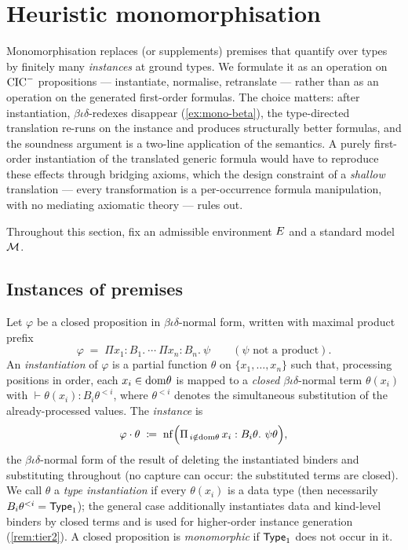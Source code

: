 \section{Heuristic monomorphisation}
\label{sec:mono}

Monomorphisation replaces (or supplements) premises that quantify
over types by finitely many \emph{instances} at ground types.  We
formulate it as an operation on $\mathrm{CIC}^{-}$ propositions --- instantiate,
normalise, retranslate --- rather than as an operation on the
generated first-order formulas.  The choice matters: after
instantiation, $\beta\iota\delta$-redexes disappear
(\cref{ex:mono-beta}), the type-directed translation re-runs on the
instance and produces structurally better formulas, and the
soundness argument is a two-line application of the semantics.  A
purely first-order instantiation of the translated generic formula
would have to reproduce these effects through bridging axioms, which
the design constraint of a \emph{shallow} translation --- every
transformation is a per-occurrence formula manipulation, with no
mediating axiomatic theory --- rules out.

Throughout this section, fix an admissible environment $E$ and a
standard model $\mathcal{M}$.

\subsection{Instances of premises}

\begin{definition}
\label{def:instantiation}
Let $\varphi$ be a closed proposition in $\beta\iota\delta$-normal
form, written with maximal product prefix
\[
  \varphi \;=\; \Pi x_1{:}B_1.\ \cdots\ \Pi x_n{:}B_n.\ \psi
  \qquad (\psi \text{ not a product}).
\]
An \emph{instantiation} of $\varphi$ is a partial function $\theta$
on $\{x_1, \ldots, x_n\}$ such that, processing positions in order,
each $x_i \in \mathrm{dom}\theta$ is mapped to a \emph{closed}
$\beta\iota\delta$-normal term $\theta(x_i)$ with $\vdash \theta(x_i)
: B_i\theta^{<i}$, where $\theta^{<i}$ denotes the simultaneous
substitution of the already-processed values.  The \emph{instance}
is
\[
  \varphi \cdot \theta \;\coloneqq\;
  \mathrm{nf}\Bigl( \Pi_{\,i \notin \mathrm{dom}\theta}\, x_i :
  B_i\theta.\ \psi\theta \Bigr),
\]
the $\beta\iota\delta$-normal form of the result of deleting the
instantiated binders and substituting throughout (no capture can
occur: the substituted terms are closed).  We call $\theta$ a
\emph{type instantiation} if every $\theta(x_i)$ is a data type
(then necessarily $B_i\theta^{<i} = \mathsf{Type}_1$); the general case
additionally instantiates data and kind-level binders by closed
terms and is used for higher-order instance generation
(\cref{rem:tier2}).  A closed proposition is \emph{monomorphic} if
$\mathsf{Type}_1$ does not occur in it.
\end{definition}

